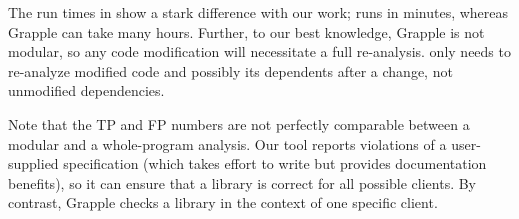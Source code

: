 The run times in  show a stark difference with our
work; \tool runs in minutes, whereas Grapple can take many hours. Further, to
our best knowledge, Grapple is not modular, so any code modification will
necessitate a full re-analysis. \Tool only needs to re-analyze modified code and
possibly its dependents after a change, not unmodified dependencies.

 Note that the TP and FP numbers are not perfectly comparable between a modular
and a whole-program analysis.
Our tool reports violations of a user-supplied specification
(which takes effort to write but provides documentation benefits), so it
can ensure that a library is correct for all possible clients.  By
contrast, Grapple checks a library in the context of one specific client.

